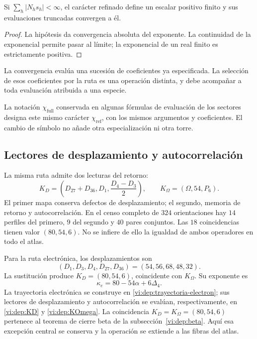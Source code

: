 \begin{proposition}
Si \(\sum_h|N_hs_h|<\infty\), el carácter refinado define un escalar
positivo finito y sus evaluaciones truncadas convergen a él.
\end{proposition}
\begin{proof}
La hipótesis da convergencia absoluta del exponente. La continuidad de la
exponencial permite pasar al límite; la exponencial de un real finito es
estrictamente positiva.
\end{proof}

La convergencia evalúa una sucesión de coeficientes ya especificada.
La selección de esos coeficientes por la ruta es una operación distinta,
y debe acompañar a toda evaluación atribuida a una especie.

La notación \(\chi_{\mathrm{full}}\) conservada en algunas fórmulas
de evaluación de los sectores designa este mismo carácter
\(\chi_{\mathrm{ref}}\), con los mismos argumentos y coeficientes.
El cambio de símbolo no añade otra especialización ni otra torre.

\subsection{Lectores de desplazamiento y autocorrelación}

La misma ruta admite dos lecturas del retorno:
\[
 K_D=\left(D_{27}+D_{36},D_1,\frac{D_4-D_3}{2}\right),\qquad
 K_\Omega=(\Omega,54,P_6).
\]
El primer mapa conserva defectos de desplazamiento; el segundo, memoria de
retorno y autocorrelación. En el censo completo de \(324\) orientaciones
hay \(14\) perfiles del primero, \(9\) del segundo y \(40\) pares
conjuntos. Las \(18\) coincidencias tienen valor \((80,54,6)\).
No se infiere de ello la igualdad de ambos operadores en todo el atlas.

Para la ruta electrónica, los desplazamientos son
\[
 (D_1,D_3,D_4,D_{27},D_{36})=(54,56,68,48,32).
\]
La sustitución produce \(K_D=(80,54,6)\), coincidente con
\(K_\Omega\). Su exponente es
\[
 \kappa_e=80-54\alpha+6\Delta_4.
\]
La trayectoria electrónica se construye en
\eqref{vi:dep:trayectoria-electron}; sus lectores de desplazamiento y
autocorrelación se evalúan, respectivamente, en
\eqref{vi:dep:KD} y \eqref{vi:dep:KOmega}. La coincidencia
\(K_D=K_\Omega=(80,54,6)\) pertenece al teorema de cierre beta de la
subsección~\ref{vi:dep:beta}. Aquí esa excepción central se conserva y la
operación se extiende a las fibras del atlas.

